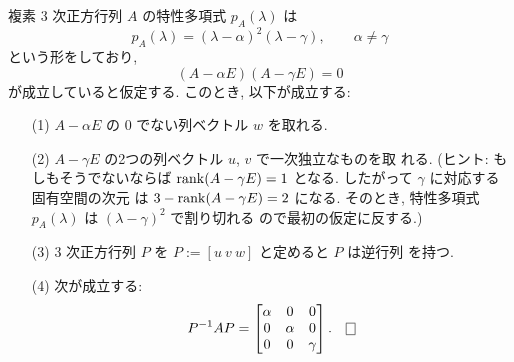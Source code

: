 \documentclass[12pt,twoside]{jarticle}
\begin{document}
\begin{question}\label{q:normal-form-3.3}
  複素 $3$ 次正方行列 $A$ の特性多項式 $p_A(\lambda)$ は
  \begin{equation*}
    p_A(\lambda) = (\lambda - \alpha)^2 (\lambda - \gamma),
    \qquad \alpha \ne \gamma
  \end{equation*}
  という形をしており,
  \begin{equation*}
    (A - \alpha E)(A - \gamma E) = 0
  \end{equation*}
  が成立していると仮定する.  このとき, 以下が成立する:
  \begin{enumerate}
  \item[(1)] $A - \alpha E$ の $0$ でない列ベクトル $w$ を取れる.
  \item[(2)] $A - \gamma E$ の2つの列ベクトル $u$, $v$ で一次独立なものを取
    れる.
    (ヒント: もしもそうでないならば $\mathop{\mathrm{rank}}\nolimits(A - \gamma E) = 1$ となる.
    したがって $\gamma$ に対応する固有空間の次元
    は $3-\mathop{\mathrm{rank}}\nolimits(A - \gamma E)=2$ になる.  そのとき, 
    特性多項式 $p_A(\lambda)$ は $(\lambda-\gamma)^2$ で割り切れる
    ので最初の仮定に反する.)
  \item[(3)] $3$ 次正方行列 $P$ を $P := [u\ v\ w]$ と定めると $P$ は逆行列
    を持つ. 
  \item[(4)] 次が成立する:
    \begin{equation*}
      P^{-1} A P 
      = 
      \begin{bmatrix}
        \alpha & 0 & 0 \\
        0 & \alpha & 0 \\
        0 & 0 & \gamma \\
      \end{bmatrix}.
      \qed
    \end{equation*}
  \end{enumerate}
\end{question}

\end{document}

